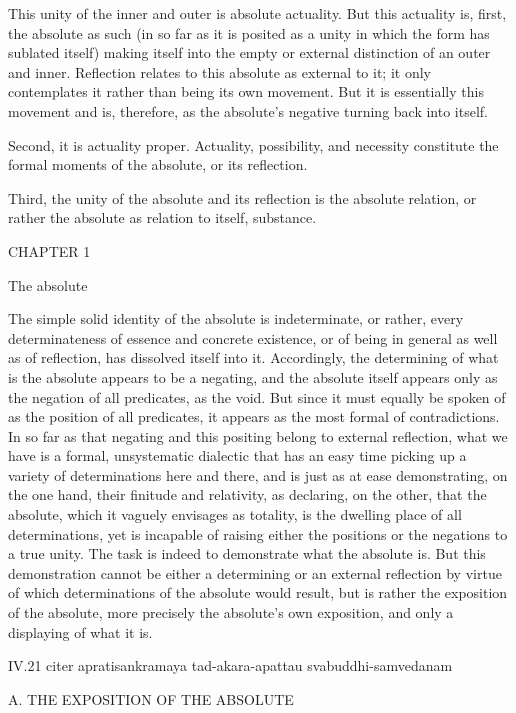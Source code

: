 This unity of the inner and outer is absolute actuality.
But this actuality is, first, the absolute as such
(in so far as it is posited as a unity
in which the form has sublated itself)
making itself into the empty or external
distinction of an outer and inner.
Reflection relates to this absolute
as external to it;
it only contemplates it
rather than being its own movement.
But it is essentially this movement
and is, therefore, as the absolute's
negative turning back into itself.

Second, it is actuality proper.
Actuality, possibility, and necessity constitute
the formal moments of the absolute,
or its reflection.

Third, the unity of the absolute
and its reflection is
the absolute relation,
or rather the absolute as
relation to itself, substance.

CHAPTER 1

The absolute

The simple solid identity of the absolute is indeterminate,
or rather, every determinateness of essence and concrete existence,
or of being in general as well as of reflection,
has dissolved itself into it.
Accordingly, the determining of what is
the absolute appears to be a negating,
and the absolute itself appears only as
the negation of all predicates, as the void.
But since it must equally be spoken of
as the position of all predicates,
it appears as the most formal of contradictions.
In so far as that negating and this positing
belong to external reflection,
what we have is a formal, unsystematic dialectic
that has an easy time picking up
a variety of determinations here and there,
and is just as at ease demonstrating, on the one hand,
their finitude and relativity, as declaring, on the other,
that the absolute, which it vaguely envisages as totality,
is the dwelling place of all determinations,
yet is incapable of raising
either the positions or the negations
to a true unity.
The task is indeed to demonstrate what the absolute is.
But this demonstration cannot be either
a determining or an external reflection
by virtue of which determinations
of the absolute would result,
but is rather the exposition of the absolute,
more precisely the absolute's own exposition,
and only a displaying of what it is.

IV.21
citer apratisankramaya tad-akara-apattau svabuddhi-samvedanam

A. THE EXPOSITION OF THE ABSOLUTE

